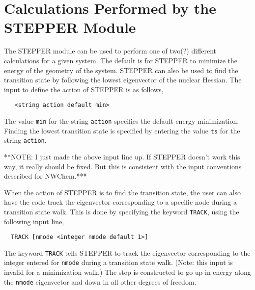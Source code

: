 



\section{Calculations Performed by the STEPPER Module}

The STEPPER module can be used to perform one of two(?) different calculations
for a given system.  The default is for STEPPER to minimize the
energy of the geometry of the system.  STEPPER can also be used to
find the transition state by following the lowest eigenvector of the nuclear
Hessian.  The input to define the action of STEPPER is as follows,

\begin{verbatim}
   <string action default min>
\end{verbatim}

The value \verb+min+ for the string \verb+action+ specifies the default
energy minimization.  Finding the lowest transition state is specified
by entering the value \verb+ts+ for the string \verb+action+.

\Large
**NOTE: I just made the above input line up.  If STEPPER doesn't work this
way, it really should be fixed.  But this is consistent with the input
conventions described for NWChem.***
\normalsize

When the action of STEPPER is to find the transition state, the user
can also have the code track the eigenvector corresponding to a specific
node during a transition state walk.  This is done by specifying the
keyword \verb+TRACK+, using the following input line,

\begin{verbatim}
  TRACK [nmode <integer nmode default 1>]
\end{verbatim}

The keyword \verb+TRACK+ tells STEPPER to track the eigenvector 
corresponding to the integer entered for \verb+nmode+ during a 
transition state walk.  (Note: this input is invalid
for a minimization walk.)  The step is constructed to go up in energy
along the \verb+nmode+ eigenvector and down in all other degrees of
freedom.

